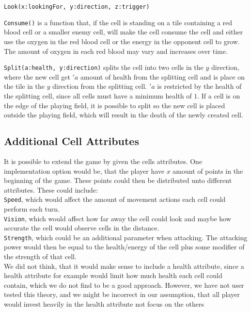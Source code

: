 \verb|Look(x:lookingFor, y:direction, z:trigger)| \newline 

\verb|Consume()| is a function that, if the cell is standing on a tile containing a red blood cell or a smaller enemy cell, will make the cell consume the cell and either use the oxygen in the red blood cell or the energy in the opponent cell to grow.
The amount of oxygen in each red blood may vary and increases over time.\newline


\verb|Split(a:health, y:direction)| splits the cell into two cells in the $y$ direction, where the new cell get $'a$ amount of health from the splitting cell and is place on the tile in the $y$ direction from the splitting cell.
$'a$ is restricted by the health of the splitting cell, since all cells must have a minimum health of $1$.
If a cell is on the edge of the playing field, it is possible to split so the new cell is placed outside the playing field, which will result in the death of the newly created cell.

\subsection{Additional Cell Attributes}
It is possible to extend the game by given the cells attributes. One implementation option would be, that the player have $x$ amount of points in the beginning of the game. These points could then be distributed unto different attributes. These could include:\\

\verb|Speed|, which would affect the amount of movement actions each cell could perform each turn.\\
\verb|Vision|, which would affect how far away the cell could look and maybe how accurate the cell would observe cells in the distance.\\
\verb|Strength|, which could be an additional parameter when attacking. The attacking power would then be equal to the health/energy of the cell plus some modifier of the strength of that cell.\\

We did not think, that it would make sense to include a health attribute, since a health attribute for example would limit how much health each cell could contain, which we do not find to be a good approach. However, we have not user tested this theory, and we might be incorrect in our assumption, that all player would invest heavily in the health attribute not focus on the others